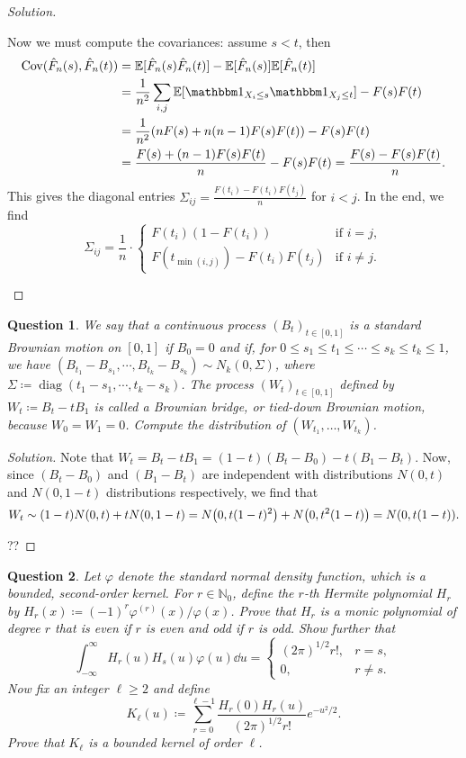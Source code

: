 \documentclass{article}
\theoremstyle{plain}
\newtheorem{question}{Question}
\theoremstyle{remark}
\newenvironment{solution}{\begin{proof}[Solution]\renewcommand\qedsymbol{}}{\end{proof}}
\renewcommand{\phi}{\varphi}
\newcommand{\Bb}{\mathbb}
\newcommand{\NN}{\Bb N}
\newcommand{\EE}{\Bb E}
\newcommand\ceq\coloneqq %
\newcommand\ind{\mathbbm 1} %
\DeclareMathOperator\Cov{Cov}
\DeclareMathOperator\diag{diag}
\begin{document}
\begin{solution}
\begin{enumerate}[(a)]
Now we must compute the covariances: assume $s < t$, then  
\begin{align*}
	\Cov(\hat F_n(s), \hat F_n(t)) &= \EE[\hat F_n(s) \hat F_n(t)] - \EE[\hat F_n(s)] \EE[\hat F_n(t)] \\
	&= \frac1{n^2} \sum_{i, j} \EE[\ind_{X_i \leq s} \ind_{X_j \leq t}] - F(s)F(t) \\
	&= \frac1{n^2} \qty(n F(s) + n(n-1) F(s)F(t)) - F(s)F(t) \\
	&= \frac{F(s) + (n-1) F(s) F(t)}{n} - F(s)F(t) = \frac{F(s) - F(s)F(t)}{n}. 
\end{align*}
This gives the diagonal entries $\Sigma_{ij} = \frac{F(t_i) - F(t_i)F(t_j)}{n}$ for $i < j$. 
In the end, we find
\[
\Sigma_{ij} = \frac1n \cdot \begin{cases}
	F(t_i)(1 - F(t_i)) &\text{if $i = j$}, \\
	F(t_{\min(i, j)}) - F(t_i) F(t_j) &\text{if $i \neq j$}. 
\end{cases}
\]
\end{enumerate} 
\end{solution}

\begin{question}
	We say that a continuous process $(B_t)_{t \in [0, 1]}$ is a \emph{standard Brownian motion} on $[0, 1]$ if $B_0 = 0$ and if, for $0 \leq s_1 \leq t_1 \leq \dotsb \leq s_k \leq t_k \leq 1$, we have $(B_{t_1} - B_{s_1}, \dotsb, B_{t_k} - B_{s_k}) \sim N_k(0, \Sigma)$, where $\Sigma \ceq \diag(t_ 1- s_1, \dotsb, t_k - s_k)$. The process $(W_t)_{t \in [0, 1]}$ defined by $W_t \ceq B_t - tB_1$ is called a \emph{Brownian bridge}, or \emph{tied-down Brownian motion}, because $W_0 = W_1 = 0$. Compute the distribution of $(W_{t_1}, \dotsc, W_{t_k})$. 
\end{question}

\begin{solution}
	Note that $W_t = B_t - t B_1 = (1-t) (B_t - B_0) - t (B_1 - B_t)$. Now, since $(B_t - B_0)$ and $(B_1 - B_t)$ are independent with distributions $N(0, t)$ and $N(0, 1-t)$ distributions respectively, we find that 
	\[
	W_t \sim (1-t) N(0, t) + t N(0, 1 - t) = N\qty(0, t(1-t)^2) + N\qty(0, t^2(1-t)) = N\qty(0, t(1-t)). 
	\]
	
	??
\end{solution}

\begin{question}
	Let $\phi$ denote the standard normal density function, which is a bounded, second-order kernel. For $r \in \NN_0$, define the $r$-th Hermite polynomial $H_r$ by $H_r(x) \ceq (-1)^r \phi^{(r)}(x) / \phi(x)$. Prove that $H_r$ is a monic polynomial of degree $r$ that is even if $r$ is even and odd if $r$ is odd. Show further that
	\[
	\int_{-\infty}^\infty H_r(u) H_s(u) \phi(u) \dd{u} = \begin{cases}
		(2\pi)^{1/2} r!, & r=s, \\ 0 , & r \neq s.
	\end{cases}
	\]
	Now fix an integer $\ell \geq 2$ and define 
	\[
	K_\ell(u) \ceq \sum_{r=0}^{\ell -1 } \frac{H_r(0) H_r(u)}{(2\pi)^{1/2} r!} e^{-u^2/2}. 
	\]
	Prove that $K_\ell$ is a bounded kernel of order $\ell$. 
\end{question}
\end{document}
